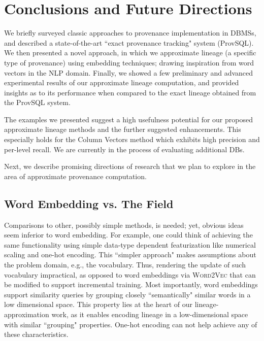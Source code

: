\chapter{Conclusions and Future Directions}
\label{chap:conclusions}

We briefly surveyed classic approaches to provenance implementation in DBMSs, and described a state-of-the-art ``exact provenance tracking" system (ProvSQL). We then presented a novel approach, in which we approximate lineage (a specific type of provenance) using embedding techniques; drawing inspiration from word vectors in the NLP domain. Finally, we showed a few preliminary and advanced experimental results of our approximate lineage computation, and provided insights as to its performance when compared to the exact lineage obtained from the  ProvSQL system. 
\par The examples we presented suggest a high usefulness potential for our proposed approximate lineage methods and the further suggested enhancements.
This especially holds for the Column Vectors method which exhibits high precision and per-level recall. We are currently in the process of evaluating additional DBs. 
\par Next, we describe promising directions of research that we plan to explore in the area of approximate provenance computation.

\section{Word Embedding vs. The Field}
Comparisons to other, possibly simple methods, is needed; yet, obvious ideas seem inferior to word embedding. For example, one could think of achieving the same functionality using simple data-type dependent featurization like numerical scaling and one-hot encoding.
This ``simpler approach" makes assumptions about the problem domain, e.g., the vocabulary. Thus, rendering the update of such vocabulary impractical, as opposed to word embeddings via \textsc{Word2Vec} that can be modified to support incremental training.
Most importantly, word embeddings support similarity queries by grouping closely ``semantically" similar words in a low dimensional space. This property lies at the heart of our lineage-approximation work, as it enables encoding lineage in a low-dimensional space with similar ``grouping" properties. One-hot encoding can not help achieve any of these characteristics.

